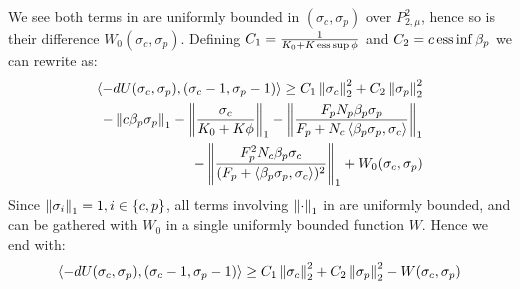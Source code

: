 We see both terms in  are uniformly bounded in $(\sigma_c,\sigma_p)$ over $P_{2,\mu}^2$, hence so is their difference $W_0(\sigma_c,\sigma_p)$.
Defining $C_1 = \frac{1}{K_0 + K \ess \sup \phi}$ and $C_2 = c \operatorname{ess} \inf \beta_p$ we can rewrite  as:
\begin{equation}
  \begin{split}
  \ip{-dU(\sigma_c,\sigma_p)}{(\sigma_c-1, \sigma_p-1)} \geq C_1 \norm{\sigma_c}^2_2 + C_2 \norm{\sigma_p}_2^2 \\
  - \norm{c\beta_p \sigma_p}_1 - \norm{\frac{\sigma_c}{K_0 + K\phi}}_1 - \norm{\frac{F_pN_p\beta_p\sigma_p}{F_p + N_c\ip{\beta_p\sigma_p}{\sigma_c}}}_1 \\
   - \norm{\frac{F_p^2 N_c\beta_p\sigma_c}{(F_p + \ip{\beta_p\sigma_p}{\sigma_c})^2}}_1 + W_0(\sigma_c,\sigma_p)
  \end{split}
\end{equation}
Since $\left \Vert \sigma_i \right \Vert_1=1, i \in \{c,p\}$, all terms involving $\left \Vert \cdot \right \Vert_1$ in  are uniformly bounded, and can be gathered with $W_0$ in a single uniformly bounded function $W$. Hence we end with:
\begin{equation}
    \left \langle -dU(\sigma_c,\sigma_p),(\sigma_c-1, \sigma_p-1) \right \rangle \geq C_1 \left \Vert \sigma_c \right \Vert_2^2 + C_2 \left \Vert \sigma_p \right \Vert_2^2 - W(\sigma_c,\sigma_p)
\end{equation}
